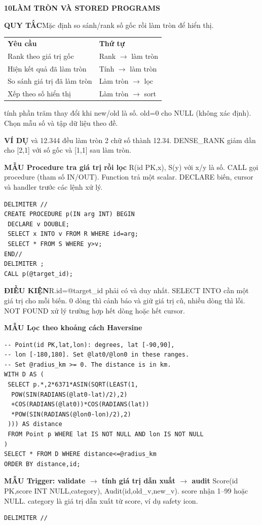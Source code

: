 \documentclass[a4paper]{article}
\newcommand{\sqlfont}{\ttfamily}
\newcommand{\bodyfontsize}{5.55}
\newcommand{\bodyleading}{5.2}
\newcommand{\bodylineskiplimit}{-2pt}
\newcommand{\bodystyle}{%
  \fontsize{\bodyfontsize}{\bodyleading}\selectfont\setlength{\lineskiplimit}{\bodylineskiplimit}\RaggedRight
  \setlength{\abovedisplayskip}{.5pt}\setlength{\belowdisplayskip}{.5pt}%
  \setlength{\abovedisplayshortskip}{.3pt}\setlength{\belowdisplayshortskip}{.3pt}}
\newcommand{\topic}[2]{\par\addvspace{.45pt}\nointerlineskip%
  \begingroup\setlength{\fboxsep}{0.35pt}%
  \noindent\colorbox{structure}{\parbox{\dimexpr\linewidth-2\fboxsep\relax}{%
    \color{white}\fontsize{6.45}{6.8}\selectfont\bfseries #1\enspace #2}}%
  \endgroup\par\nobreak\vspace{.55pt}\nointerlineskip\nobreak}
\newenvironment{topicblock}
  {\par\bodystyle}
  {\par}
\newcommand{\key}[1]{\par\textcolor{structure}{\textbf{#1}}\enspace}
\newcommand{\note}[4]{\par\nointerlineskip\vspace{.25pt}\begingroup\setlength{\fboxsep}{0.1pt}%
  \noindent\colorbox{#1}{\parbox{\dimexpr\linewidth-2\fboxsep\relax}{%
    \RaggedRight\textcolor{#2}{\textbf{#3}}\enspace #4}}%
  \endgroup\par\nointerlineskip\vspace{.25pt}}
\newcommand{\cond}[1]{\note{conditionbg}{condition}{ĐIỀU KIỆN}{#1}}
\newcommand{\ex}[1]{\note{examplebg}{example}{VÍ DỤ}{#1}}
\newcommand{\ruleline}[1]{\key{QUY TẮC}#1\par}
\newcommand{\pattern}[1]{\key{MẪU #1}}
\newcommand{\sql}[1]{{\sqlfont\color{sqltext}\detokenize{#1}}}
\newlength{\sheetwidth}
\newenvironment{sheetcolumns}[1]
  {\noindent\begin{minipage}[t]{#1\sheetwidth}\vspace{0pt}\bodystyle\ignorespaces}
  {\end{minipage}\par}
\begin{document}
\begin{sheetcolumns}{.258}
\begin{topicblock}
\topic{10}{LÀM TRÒN VÀ STORED PROGRAMS}
\ruleline{Mặc định so sánh/rank số gốc rồi làm tròn để hiển thị.}
\par\begin{tabular}{@{}ll@{}}
\textbf{Yêu cầu} & \textbf{Thứ tự}\\
Rank theo giá trị gốc & Rank $\to$ làm tròn\\
Hiện kết quả đã làm tròn & Tính $\to$ làm tròn\\
So sánh giá trị đã làm tròn & Làm tròn $\to$ lọc\\
Xếp theo số hiển thị & Làm tròn $\to$ sort
\end{tabular}\par
\sql{100.0*(new-old)/NULLIF(old,0)} tính phần trăm thay đổi khi new/old là số. old=0 cho NULL (không xác định). Chọn mẫu số và tập dữ liệu theo đề.
\ex{12.341 và 12.344 đều làm tròn 2 chữ số thành 12.34. DENSE\_RANK giảm dần cho [2,1] với số gốc và [1,1] sau làm tròn.}
\pattern{Procedure tra giá trị rồi lọc}
R(id PK,x), S(y) với x/y là số. CALL gọi procedure (tham số IN/OUT). Function trả một scalar. DECLARE biến, cursor và handler trước các lệnh xử lý.
\begin{lstlisting}
DELIMITER //
CREATE PROCEDURE p(IN arg INT) BEGIN
 DECLARE v DOUBLE;
 SELECT x INTO v FROM R WHERE id=arg;
 SELECT * FROM S WHERE y>v;
END//
DELIMITER ;
CALL p(@target_id);
\end{lstlisting}
\cond{R.id=@target\_id phải có và duy nhất. SELECT INTO cần một giá trị cho mỗi biến. 0 dòng thì cảnh báo và giữ giá trị cũ, nhiều dòng thì lỗi. NOT FOUND xử lý trường hợp hết dòng hoặc hết cursor.}
\pattern{Lọc theo khoảng cách Haversine}
\begin{lstlisting}
-- Point(id PK,lat,lon): degrees, lat [-90,90],
-- lon [-180,180]. Set @lat0/@lon0 in these ranges.
-- Set @radius_km >= 0. The distance is in km.
WITH D AS (
 SELECT p.*,2*6371*ASIN(SQRT(LEAST(1,
  POW(SIN(RADIANS(@lat0-lat)/2),2)
  +COS(RADIANS(@lat0))*COS(RADIANS(lat))
  *POW(SIN(RADIANS(@lon0-lon)/2),2)
 ))) AS distance
 FROM Point p WHERE lat IS NOT NULL AND lon IS NOT NULL
)
SELECT * FROM D WHERE distance<=@radius_km
ORDER BY distance,id;
\end{lstlisting}
\pattern{Trigger: validate $\to$ tính giá trị dẫn xuất $\to$ audit}
Score(id PK,score INT NULL,category), Audit(id,old\_v,new\_v). score nhận 1--99 hoặc NULL. category là giá trị dẫn xuất từ score, ví dụ safety icon.
\begin{lstlisting}
DELIMITER //

\end{lstlisting}
\end{topicblock}
\end{sheetcolumns}
\end{document}
